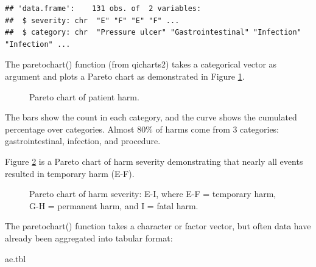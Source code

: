 \documentclass[
]{book}
\makeatletter
\newenvironment{Shaded}{\begin{snugshade}}{\end{snugshade}}
\newcommand{\FunctionTok}[1]{\textcolor[rgb]{0.13,0.29,0.53}{\textbf{#1}}}
\newcommand{\NormalTok}[1]{#1}
\newcommand{\SpecialCharTok}[1]{\textcolor[rgb]{0.81,0.36,0.00}{\textbf{#1}}}
\newcommand*\pandocbounded[1]{%
  \sbox\pandoc@box{#1}%
  \Gscale@div\@tempa{\textheight}{\dimexpr\ht\pandoc@box+\dp\pandoc@box\relax}%
  \Gscale@div\@tempb{\linewidth}{\wd\pandoc@box}%
  \ifdim\@tempb\p@<\@tempa\p@\let\@tempa\@tempb\fi%
  \ifdim\@tempa\p@<\p@\scalebox{\@tempa}{\usebox\pandoc@box}%
  \else\usebox{\pandoc@box}%
  \fi%
}
\makeatother
\begin{document}
\begin{verbatim}
## 'data.frame':    131 obs. of  2 variables:
##  $ severity: chr  "E" "F" "E" "F" ...
##  $ category: chr  "Pressure ulcer" "Gastrointestinal" "Infection" "Infection" ...
\end{verbatim}

The paretochart() function (from qicharts2) takes a categorical vector as argument and plots a Pareto chart as demonstrated in Figure \ref{fig:pareto-fig1}.

\begin{Shaded}
\end{Shaded}

\begin{figure}
\centering
\pandocbounded{}
\caption{\label{fig:pareto-fig1}Pareto chart of patient harm.}
\end{figure}

The bars show the count in each category, and the curve shows the cumulated percentage over categories. Almost 80\% of harms come from 3 categories: gastrointestinal, infection, and procedure.

Figure \ref{fig:pareto-fig2} is a Pareto chart of harm severity demonstrating that nearly all events resulted in temporary harm (E-F).

\begin{Shaded}
\end{Shaded}

\begin{figure}
\centering
\pandocbounded{}
\caption{\label{fig:pareto-fig2}Pareto chart of harm severity: E-I, where E-F = temporary harm, G-H = permanent harm, and I = fatal harm.}
\end{figure}

The paretochart() function takes a character or factor vector, but often data have already been aggregated into tabular format:

\begin{Shaded}
\begin{Highlighting}[]
\NormalTok{ae.tbl}
\end{Highlighting}
\end{Shaded}
\end{document}
